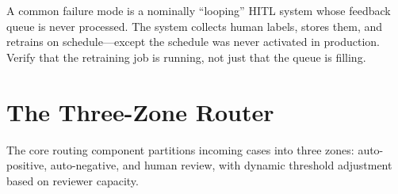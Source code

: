 \begin{cautionbox}
A common failure mode is a nominally ``looping'' HITL system whose feedback queue is never processed. The system collects human labels, stores them, and retrains on schedule---except the schedule was never activated in production. Verify that the retraining job is running, not just that the queue is filling.
\end{cautionbox}

\section{The Three-Zone Router}

The core routing component partitions incoming cases into three zones: auto-positive, auto-negative, and human review, with dynamic threshold adjustment based on reviewer capacity.


